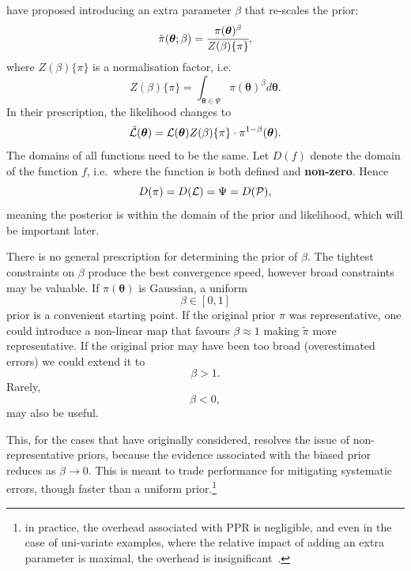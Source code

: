 \documentclass[usenatbib]{mnras}
\begin{document}
\citeauthor{chen-ferroz-hobson} have proposed introducing an
extra parameter \(\beta\) that re-scales the prior:
\begin{equation*}
  \tilde{\pi}(\bm{\bm{\theta}};\beta) = \cfrac{\pi(\bm{\theta})^{\beta}}{Z(\beta)\{\pi\}},
\end{equation*}
where \(Z(\beta)\{\pi\}\) is a normalisation factor, i.e. 
\begin{equation*}
  Z(\beta)\{\pi\} = \int_{\bm{\theta} \in \Psi} \pi(\bm{\bm{\theta}})^{\beta}d\bm{\bm{\theta}}.
\end{equation*}
In their prescription, the likelihood changes to
\begin{equation*}
  \tilde{\cal L}(\bm{\theta}) = {\cal L}(\bm{\theta}) Z(\beta)\{\pi\} \cdot \pi^{1-\beta}(\bm{\theta}).
\end{equation*}
The domains of all functions need to be the same. Let
\(D(f)\) denote the domain of the function \(f\), i.e.~where the
function is both defined and \textbf{non-zero}. Hence
\begin{equation*}
  D(\pi) = D({\cal L}) = \Psi = D({\cal P}),
\end{equation*} 
meaning the posterior is within the domain of the prior and
likelihood, which will be important later.\label{domain-discussion}

There is no general prescription for determining the prior of
\(\beta\). The tightest constraints on \(\beta\) produce the best
convergence speed, however broad constraints may be valuable.  If
\(\pi(\bm{\theta})\) is Gaussian, a uniform 
\[\beta\in[0,1]\] prior is a convenient starting point.
If the original prior \(\pi\) was representative, one could introduce
a non-linear map that favours \(\beta\approx 1\) making
\(\tilde{\pi}\) more representative. If the original prior may have
been too broad (overestimated errors) we could extend it
to \[\beta>1.\] Rarely, \[\beta<0,\] may also be useful.

This, for the cases that \citeauthor{chen-ferroz-hobson} have
originally considered, resolves the issue of non-representative
priors, because the evidence associated with the biased prior reduces
as \(\beta\rightarrow0\). This is meant to trade performance for
mitigating systematic errors, though faster than a uniform
prior.\footnote{in practice, the overhead associated with PPR is
  negligible, and even in the case of uni-variate examples, where the
  relative impact of adding an extra parameter is maximal, the
  overhead is insignificant~\cite[see][section ``numerical
  examples'']{chen-ferroz-hobson}.}
\end{document}

